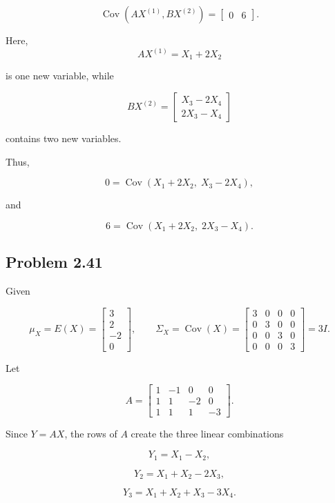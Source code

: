 \documentclass[12pt]{article}
\begin{document}
	\[
	\boxed{
		\operatorname{Cov}(AX^{(1)},BX^{(2)})
		=
		\begin{bmatrix}
			0&6
		\end{bmatrix}
	}.
	\]
	
	Here,
	\[
	AX^{(1)}=X_1+2X_2
	\]
	
	is one new variable, while
	
	\[
	BX^{(2)}
	=
	\begin{bmatrix}
		X_3-2X_4\\
		2X_3-X_4
	\end{bmatrix}
	\]
	
	contains two new variables.
	
	Thus,
	
	\[
	0=
	\operatorname{Cov}
	(X_1+2X_2,\;X_3-2X_4),
	\]
	
	and
	
	\[
	6=
	\operatorname{Cov}
	(X_1+2X_2,\;2X_3-X_4).
	\]
	
	\subsection*{Problem 2.41}
	
	Given
	
	\[
	\mu_X=E(X)=
	\begin{bmatrix}
		3\\
		2\\
		-2\\
		0
	\end{bmatrix},
	\qquad
	\Sigma_X=\operatorname{Cov}(X)
	=
	\begin{bmatrix}
		3&0&0&0\\
		0&3&0&0\\
		0&0&3&0\\
		0&0&0&3
	\end{bmatrix}
	=3I.
	\]
	
	Let
	
	\[
	A=
	\begin{bmatrix}
		1&-1&0&0\\
		1&1&-2&0\\
		1&1&1&-3
	\end{bmatrix}.
	\]
	
	Since $Y=AX$, the rows of $A$ create the three linear
	combinations
	
	\[
	Y_1=X_1-X_2,
	\]
	
	\[
	Y_2=X_1+X_2-2X_3,
	\]
	
	\[
	Y_3=X_1+X_2+X_3-3X_4.
	\]
	
	
\end{document}
